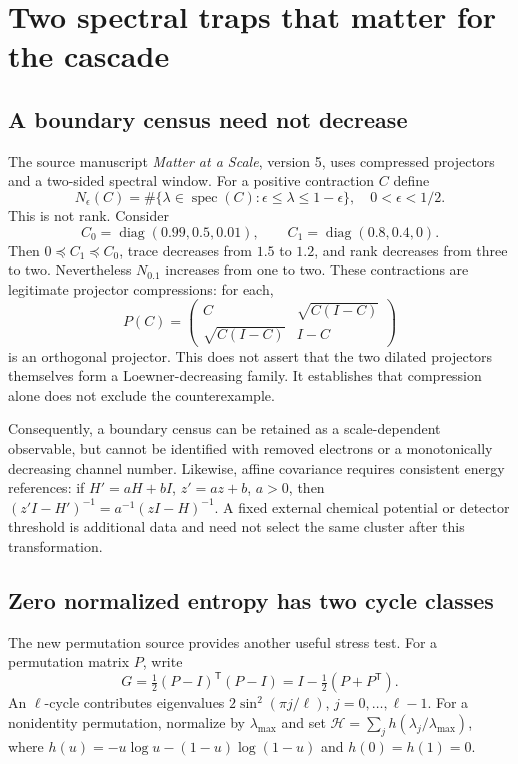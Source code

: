 \documentclass[11pt]{article}
\begin{document}
\section{Two spectral traps that matter for the cascade}
\subsection{A boundary census need not decrease}
The source manuscript \emph{Matter at a Scale}, version 5, uses compressed projectors and a two-sided spectral window. For a positive contraction $C$ define
\begin{equation}
N_\epsilon(C)=\#\{\lambda\in\operatorname{spec}(C):\epsilon\leq\lambda\leq1-\epsilon\},\quad 0<\epsilon<1/2.
\end{equation}
This is not rank. Consider
\begin{equation}
C_0=\operatorname{diag}(0.99,0.5,0.01),\qquad
C_1=\operatorname{diag}(0.8,0.4,0).
\end{equation}
Then $0\preceq C_1\preceq C_0$, trace decreases from $1.5$ to $1.2$, and rank decreases from three to two. Nevertheless $N_{0.1}$ increases from one to two. These contractions are legitimate projector compressions: for each,
\begin{equation}
P(C)=\begin{pmatrix}C&\sqrt{C(I-C)}\\\sqrt{C(I-C)}&I-C\end{pmatrix}
\end{equation}
is an orthogonal projector. This does not assert that the two dilated projectors themselves form a Loewner-decreasing family. It establishes that compression alone does not exclude the counterexample.

Consequently, a boundary census can be retained as a scale-dependent observable, but cannot be identified with removed electrons or a monotonically decreasing channel number. Likewise, affine covariance requires consistent energy references: if $H'=aH+bI$, $z'=az+b$, $a>0$, then $(z'I-H')^{-1}=a^{-1}(zI-H)^{-1}$. A fixed external chemical potential or detector threshold is additional data and need not select the same cluster after this transformation.

\subsection{Zero normalized entropy has two cycle classes}
The new permutation source provides another useful stress test. For a permutation matrix $P$, write
\begin{equation}
G=\tfrac12(P-I)^{\mathsf T}(P-I)=I-\tfrac12(P+P^{\mathsf T}).
\end{equation}
An $\ell$-cycle contributes eigenvalues $2\sin^2(\pi j/\ell)$, $j=0,\ldots,\ell-1$. For a nonidentity permutation, normalize by $\lambda_{\max}$ and set $\mathcal H=\sum_j h(\lambda_j/\lambda_{\max})$, where $h(u)=-u\log u-(1-u)\log(1-u)$ and $h(0)=h(1)=0$.
\end{document}
